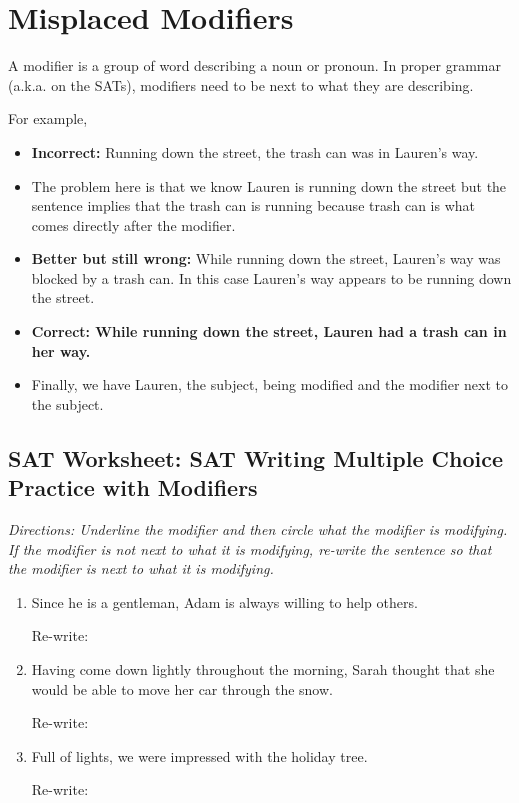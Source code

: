 \section{Misplaced Modifiers}
A modifier is a group of word describing a noun or pronoun. In proper grammar (a.k.a. on the SATs), modifiers need to be next to what they are describing.


For example,

\bigskip
\begin{itemize}
\item{\textbf{Incorrect:} Running down the street, the trash can was in Lauren's way.}
\item{The problem here is that we know Lauren is running down the street but the sentence implies that the trash can is running because trash can is what comes directly after the modifier.}
\item{\textbf{Better but still wrong:} While running down the street, Lauren's way was blocked by a trash can. In this case Lauren's way appears to be running down the street.}
\item{\textbf{Correct: While running down the street, Lauren had a trash can in her way.}}
\item{Finally, we have Lauren, the subject, being modified and the modifier next to the subject.}
\end{itemize} 

\subsection{SAT Worksheet: SAT Writing Multiple Choice Practice with Modifiers}
\textit{Directions: Underline the modifier and then circle what the modifier is modifying. If the modifier is not next to what it is modifying, re-write the sentence so that the modifier is next to what it is modifying.}

\bigskip
\begin{enumerate}
\item{Since he is a gentleman, Adam is always willing to help others.}

Re-write: \hrulefill

\item{Having come down lightly throughout the morning, Sarah thought that she would be able to move her car through the snow.}

Re-write: \hrulefill

\item{Full of lights, we were impressed with the holiday tree.}

Re-write: \hrulefill

\end{enumerate}

